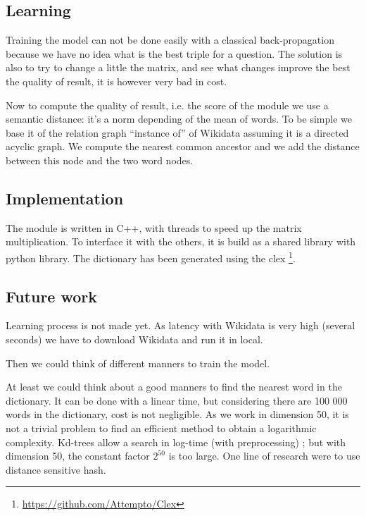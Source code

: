 \subsection{Learning}

Training the model can not be done easily with a classical back-propagation because we have no idea what is the best triple for a question. The solution is also to try to change a little the matrix, and see what changes improve the best the quality of result, it is however very bad in cost. 

Now to compute the quality of result, i.e. the score  of the module we use a semantic distance: it's a norm depending of the mean of words. To be simple we base it of the relation graph ``instance of'' of Wikidata assuming it is a directed acyclic graph. We compute the nearest common ancestor and we add the distance between this node and the two word  nodes.

\subsection{Implementation}

The module is written in C++, with threads to speed up the matrix multiplication. To interface it with the others, it is build as a shared library with python library. The dictionary has been generated using the clex \footnote{\url{https://github.com/Attempto/Clex}}. 

\subsection{Future work}

Learning process is not made yet. As latency with Wikidata is very high (several seconds) we have to download Wikidata and run it in local.

Then we could think of different manners to train the model.

At least we could think about a good manners to find the nearest word in the dictionary. It can be done with a linear time, but considering there are 100 000 words in the dictionary, cost is not negligible. As we work in dimension 50, it is not a trivial problem to find an efficient method to obtain a logarithmic complexity. Kd-trees allow a search in log-time (with preprocessing) ; but with dimension 50, the constant factor $2^{50}$ is too large. One line of research were to use distance sensitive hash.


